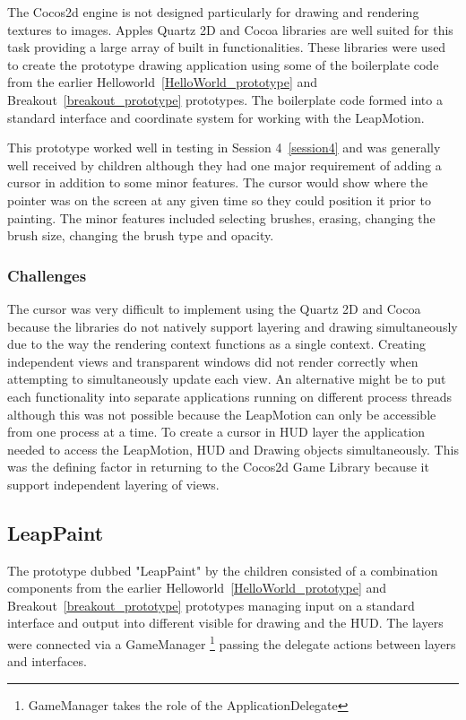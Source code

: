 The Cocos2d engine is not designed particularly for drawing and rendering textures to images. Apples Quartz 2D and Cocoa libraries are well suited for this task providing a large array of built in functionalities. These libraries were used to create the prototype drawing application using some of the boilerplate code from the earlier Helloworld~\ref{HelloWorld_prototype} and Breakout~\ref{breakout_prototype} prototypes. The boilerplate code formed into a standard interface and coordinate system for working with the LeapMotion. \cite{appleapi}


This prototype worked well in testing in Session 4~\ref{session4} and was generally well received by children although they had one major requirement of adding a cursor in addition to some minor features. The cursor would show where the pointer was on the screen at any given time so they could position it prior to painting. The minor features included selecting brushes, erasing, changing the brush size, changing the brush type and opacity.  

\subsubsection{Challenges}
The cursor was very difficult to implement using the Quartz 2D and Cocoa because the libraries do not natively support layering and drawing simultaneously due to the way the rendering context functions as a single context. Creating independent views and transparent windows did not render correctly when attempting to simultaneously update each view. An alternative might be to put each functionality into separate applications running on different process threads although this was not possible because the LeapMotion can only be accessible from one process at a time. To create a cursor in  HUD layer the application needed to access the LeapMotion, HUD and Drawing objects simultaneously. This was the defining factor in returning to the Cocos2d Game Library because it support independent layering of views. \cite{appleapi}

\subsection{LeapPaint}\label{leappaint_prototype}

The prototype dubbed "LeapPaint" by the children consisted of a combination components from the earlier Helloworld~\ref{HelloWorld_prototype} and Breakout~\ref{breakout_prototype} prototypes managing input on a standard interface and output into different visible for drawing and the HUD. The layers were connected via a GameManager \footnote{GameManager takes the role of the ApplicationDelegate} passing the delegate actions between layers and interfaces. 


